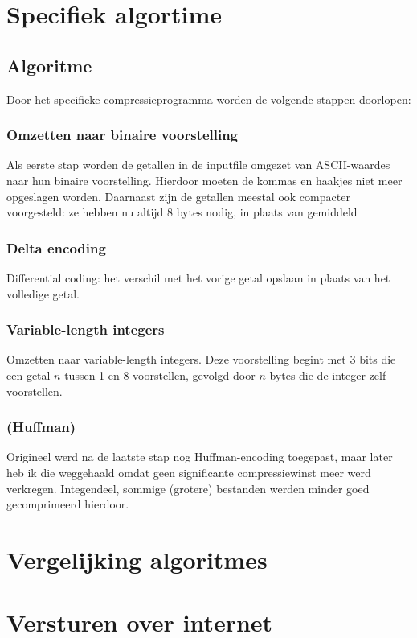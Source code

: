 \documentclass[a4paper]{article}
\begin{document}



\section{Specifiek algortime}

\subsection{Algoritme}
Door het specifieke compressieprogramma worden de volgende stappen doorlopen:
\subsubsection{Omzetten naar binaire voorstelling}
Als eerste stap worden de getallen in de inputfile omgezet van ASCII-waardes naar hun binaire voorstelling. Hierdoor moeten de kommas en haakjes niet meer opgeslagen worden. Daarnaast zijn de getallen meestal ook compacter voorgesteld: ze hebben nu altijd 8 bytes nodig, in plaats van gemiddeld 
\subsubsection{Delta encoding}
Differential coding: het verschil met het vorige getal opslaan in plaats van het volledige getal.
\subsubsection{Variable-length integers}
Omzetten naar variable-length integers. Deze voorstelling begint met 3 bits die een getal $n$ tussen 1 en 8 voorstellen, gevolgd door $n$ bytes die de integer zelf voorstellen.

\subsubsection{(Huffman)}
Origineel werd na de laatste stap nog Huffman-encoding toegepast, maar later heb ik die weggehaald omdat geen significante compressiewinst meer werd verkregen.
Integendeel, sommige (grotere) bestanden werden minder goed gecomprimeerd hierdoor.

\section{Vergelijking algoritmes}


\section{Versturen over internet}
\end{document}
